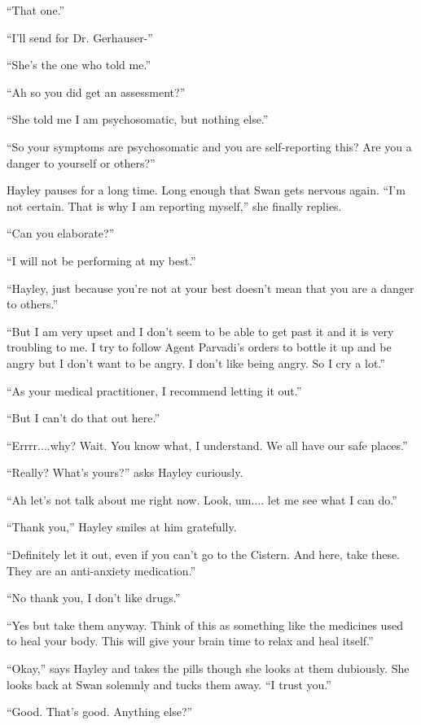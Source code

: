 ``That one.''

``I'll send for Dr. Gerhauser-''

``She's the one who told me.''

``Ah so you did get an assessment?''

``She told me I am psychosomatic, but nothing else.''

``So your symptoms are psychosomatic and you are self-reporting this?  Are you a danger to yourself or others?''

Hayley pauses for a long time.  Long enough that Swan gets nervous again.  ``I'm not certain.  That is why I am reporting myself,'' she finally replies.

``Can you elaborate?''

``I will not be performing at my best.''

``Hayley, just because you're not at your best doesn't mean that you are a danger to others.''

``But I am very upset and I don't seem to be able to get past it and it is very troubling to me.  I try to follow Agent Parvadi's orders to bottle it up and be angry but I don't want to be angry.  I don't like being angry.  So I cry a lot.''

``As your medical practitioner, I recommend letting it out.''

``But I can't do that out here.''

``Errrr....why?  Wait.  You know what, I understand.  We all have our safe places.''

``Really?  What's yours?'' asks Hayley curiously.

``Ah let's not talk about me right now.  Look, um.... let me see what I can do.''

``Thank you,'' Hayley smiles at him gratefully.

``Definitely let it out, even if you can't go to the Cistern.  And here, take these.  They are an anti-anxiety medication.''

``No thank you, I don't like drugs.''

``Yes but take them anyway.  Think of this as something like the medicines used to heal your body.  This will give your brain time to relax and heal itself.''

``Okay,'' says Hayley and takes the pills though she looks at them dubiously.  She looks back at Swan solemnly and tucks them away.   ``I trust you.''

``Good.  That's good.  Anything else?''

